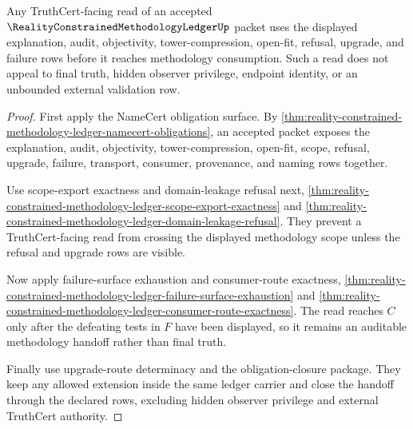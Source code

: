 \begin{theorem}
\label{thm:reality-constrained-methodology-ledger-root-truthcert-handoff}
Any TruthCert-facing read of an accepted
$\RealityConstrainedMethodologyLedgerUp$ packet uses the displayed explanation,
audit, objectivity, tower-compression, open-fit, refusal, upgrade, and failure
rows before it reaches methodology consumption. Such a read does not appeal to
final truth, hidden observer privilege, endpoint identity, or an unbounded
external validation row.
\end{theorem}
\begin{proof}
First apply the NameCert obligation surface. By
\autoref{thm:reality-constrained-methodology-ledger-namecert-obligations}, an
accepted packet exposes the explanation, audit, objectivity,
tower-compression, open-fit, scope, refusal, upgrade, failure, transport,
consumer, provenance, and naming rows together.

Use scope-export exactness and domain-leakage refusal next,
\autoref{thm:reality-constrained-methodology-ledger-scope-export-exactness}
and
\autoref{thm:reality-constrained-methodology-ledger-domain-leakage-refusal}.
They prevent a TruthCert-facing read from crossing the displayed methodology
scope unless the refusal and upgrade rows are visible.

Now apply failure-surface exhaustion and consumer-route exactness,
\autoref{thm:reality-constrained-methodology-ledger-failure-surface-exhaustion}
and
\autoref{thm:reality-constrained-methodology-ledger-consumer-route-exactness}.
The read reaches $C$ only after the defeating tests in $F$ have been displayed,
so it remains an auditable methodology handoff rather than final truth.

Finally use upgrade-route determinacy and the obligation-closure package. They
keep any allowed extension inside the same ledger carrier and close the handoff
through the declared rows, excluding hidden observer privilege and external
TruthCert authority.
\end{proof}

